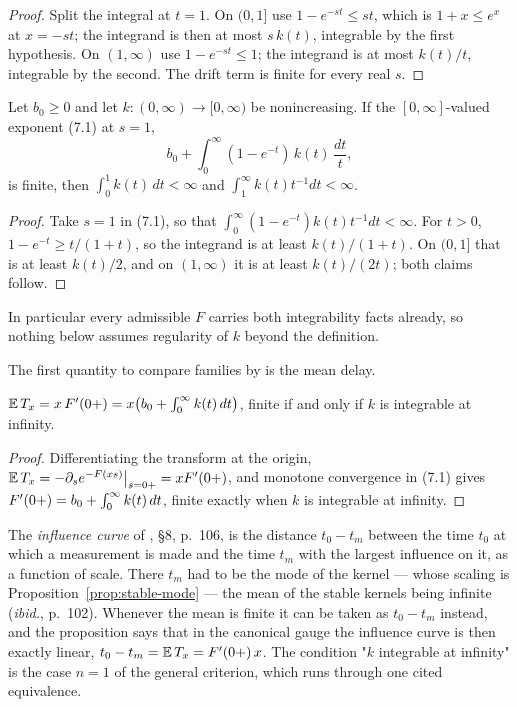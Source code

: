 \begin{proof}
Split the integral at $t = 1$. On $(0,1]$ use $1 - e^{-st} \le st$, which is $1 + x \le e^x$ at
$x = -st$; the integrand is then at most $s\,k(t)$, integrable by the first hypothesis. On
$(1,\infty)$ use $1 - e^{-st} \le 1$; the integrand is at most $k(t)/t$, integrable by the
second. The drift term is finite for every real $s$.
\end{proof}

\begin{lemma}\label{lem:criterion-converse}
Let $b_0 \ge 0$ and let $k : (0,\infty) \to [0,\infty)$ be nonincreasing. If the $[0,\infty]$-valued
exponent (7.1) at $s = 1$,
\[
  b_0 + \int_0^\infty (1 - e^{-t})\,k(t)\,\frac{dt}{t} ,
\]
is finite, then $\int_0^1 k(t)\,dt < \infty$ and $\int_1^\infty k(t)t^{-1}dt < \infty$.
\end{lemma}

\begin{proof}
Take $s = 1$ in (7.1), so that $\int_0^\infty (1 - e^{-t})k(t)t^{-1}dt < \infty$. For $t > 0$,
$1 - e^{-t} \ge t/(1+t)$, so the integrand is at least $k(t)/(1+t)$. On $(0,1]$ that is at least
$k(t)/2$, and on $(1,\infty)$ it is at least $k(t)/(2t)$; both claims follow.
\end{proof}

In particular every admissible $F$ carries both integrability facts already, so nothing below
assumes regularity of $k$ beyond the definition.

The first quantity to compare families by is the mean delay.

\begin{proposition}\label{prop:moments}
$\mathbb{E}\,T_x = x\,F'(0{+}) = x\bigl(b_0 + \int_0^\infty k(t)\,dt\bigr)$, finite if and only if $k$
is integrable at infinity.
\end{proposition}

\begin{proof}
Differentiating the transform at the origin,
$\mathbb{E}\,T_x = -\partial_s e^{-F(xs)}\big|_{s=0{+}} = x F'(0{+})$, and monotone convergence in
(7.1) gives $F'(0{+}) = b_0 + \int_0^\infty k(t)\,dt$, finite exactly when $k$ is integrable at
infinity.
\end{proof}

The \emph{influence curve} of , \S8, p.~106, is the
distance $t_0 - t_m$ between the time $t_0$ at which a measurement is made and the time
$t_m$ with the largest influence on it, as a function of scale. There $t_m$ had to be the
mode of the kernel --- whose scaling is Proposition~\ref{prop:stable-mode} --- the mean of the stable kernels being infinite (\emph{ibid.}, p.~102).
Whenever the mean is finite it can be taken as $t_0 - t_m$ instead, and the proposition
says that in the canonical gauge the influence curve is then exactly linear,
$t_0 - t_m = \mathbb{E}\,T_x = F'(0{+})\,x$. The
condition "$k$ integrable at infinity" is the case $n = 1$ of the general criterion, which
runs through one cited equivalence.

